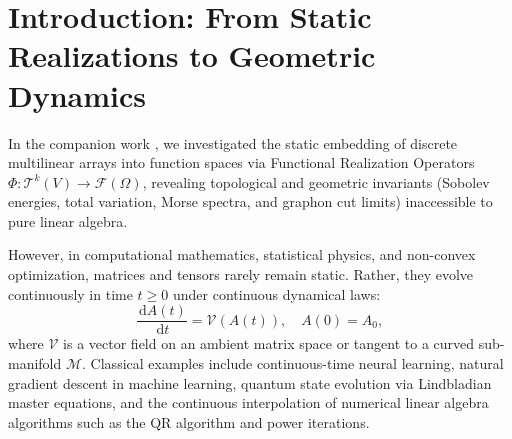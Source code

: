 \documentclass[11pt,a4paper,reqno]{amsart}
\theoremstyle{definition}
\numberwithin{equation}{section}
\newcommand{\dif}{\,\mathrm{d}}
\begin{document}
\section{Introduction: From Static Realizations to Geometric Dynamics}
\label{sec:intro}

In the companion work \cite{turing2026beyond}, we investigated the static embedding of discrete multilinear arrays into function spaces via Functional Realization Operators $\Phi \colon \mathcal{T}^k(V) \to \mathcal{F}(\Omega)$, revealing topological and geometric invariants (Sobolev energies, total variation, Morse spectra, and graphon cut limits) inaccessible to pure linear algebra. 

However, in computational mathematics, statistical physics, and non-convex optimization, matrices and tensors rarely remain static. Rather, they evolve continuously in time $t \ge 0$ under continuous dynamical laws:
\begin{equation}
    \label{eq:matrix_ode_general}
    \frac{\dif A(t)}{\dif t} = \mathcal{V}(A(t)), \quad A(0) = A_0,
\end{equation}
where $\mathcal{V}$ is a vector field on an ambient matrix space or tangent to a curved sub-manifold $\mathcal{M}$. Classical examples include continuous-time neural learning, natural gradient descent in machine learning, quantum state evolution via Lindbladian master equations, and the continuous interpolation of numerical linear algebra algorithms such as the QR algorithm and power iterations.
\end{document}
